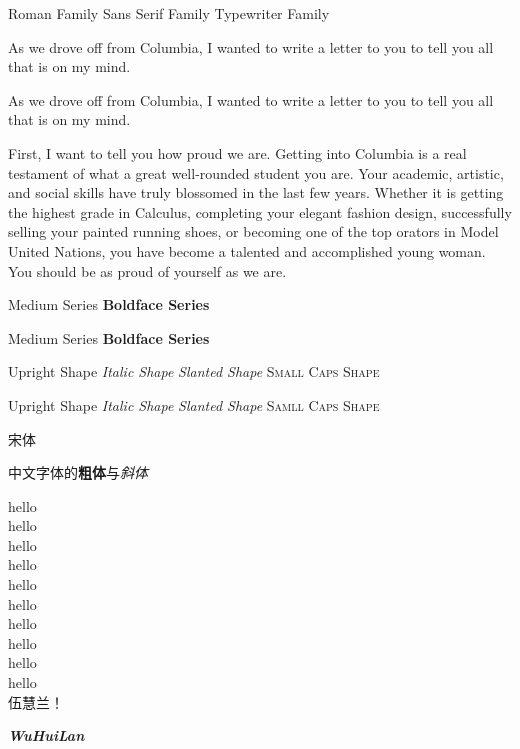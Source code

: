 \documentclass[12pt]{article}
\newcommand{\myfont}{\textit{\textbf{\textsf{WuHuiLan}}}}
\begin{document}
	
	\rmfamily Roman Family {\sffamily Sans Serif Family}
	{\ttfamily Typewriter Family}
	
	\textsf{ As we drove off from Columbia, I wanted to write a letter to you to tell you all that is on my mind.}
	
	\sffamily As we drove off from Columbia, I wanted to write a letter to you to tell you all that is on my mind.
	
	{\rmfamily First, I want to tell you how proud we are. Getting into Columbia is a real testament of what a great well-rounded student you are. Your academic, artistic, and social skills have truly blossomed in the last few years. Whether it is getting the highest grade in Calculus, completing your elegant fashion design, successfully selling your painted running shoes, or becoming one of the top orators in Model United Nations, you have become a talented and accomplished young woman. You should be as proud of yourself as we are.}
	
	
	\textmd{Medium Series}  \textbf{Boldface Series}
	
	{\mdseries Medium Series} {\bfseries Boldface Series}
	
	
	\textup{Upright Shape} \textit{Italic Shape}
	\textsl{Slanted Shape} \textsc{Small Caps Shape}
	
	{\upshape  Upright  Shape}  {\itshape Italic Shape}
	{\slshape Slanted Shape}   {\scshape Samll Caps Shape}
	
	
	{\songti 宋体}  
	
	中文字体的\textbf{粗体}与\textit{斜体}
	
	{\tiny         hello}\\
	{\scriptsize   hello}\\
	{\footnotesize hello}\\
	{\small		   hello}\\
	{\normalsize   hello}\\
	{\large		   hello}\\
	{\Large	       hello}\\
	{\LARGE        hello}\\  
	{\huge         hello}\\
	{\Huge         hello}\\
	
	 伍慧兰！
	
	
	\myfont
	
\end{document}
